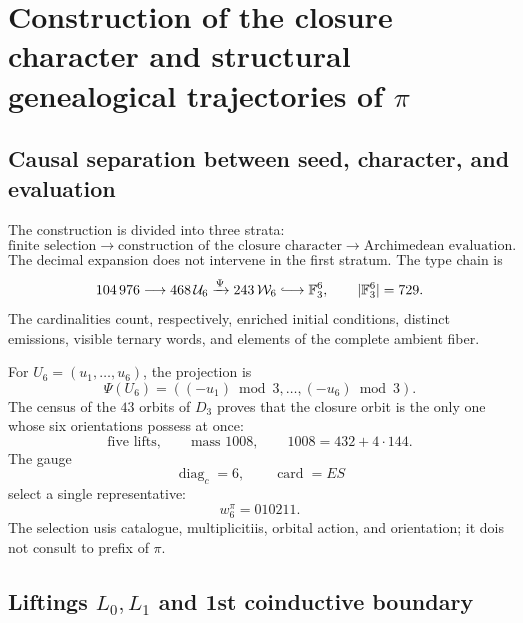 \label{chap:83-08}


\section{Construction of the closure character and structural genealogical trajectories of \(\pi\)}
\label{p12-83-c8-s1:chap:biografia-pi-autonoma}

\subsection{Causal separation between seed, character, and evaluation}

The construction is divided into three strata:
\[
 \text{finite selection}
 \longrightarrow
 \text{construction of the closure character}
 \longrightarrow
 \text{Archimedean evaluation}.
\]
The decimal expansion does not intervene in the first stratum. The type chain
is
\begin{equation}
 104\,976
 \longrightarrow468\,\mathcal U_6
 \xrightarrow{\Psi}243\,\mathcal W_6
 \lhook\joinrel\longrightarrow\mathbb F_3^6,
 \qquad|\mathbb F_3^6|=729.
 \label{p12-83-c8-s1:eq:cadena-tipica-pi-autonoma}
\end{equation}
The cardinalities count, respectively, enriched initial conditions,
distinct emissions, visible ternary words, and elements
of the complete ambient fiber.

For \(U_6=(u_1,\ldots,u_6)\), the projection is
\[
 \Psi(U_6)=((-u_1)\bmod3,\ldots,(-u_6)\bmod3).
\]
The census of the \(43\) orbits of \(D_3\) proves that the closure
orbit is the only one whose six orientations possess at once:
\[
 \text{five lifts},\qquad
 \text{mass }1008,\qquad
 1008=432+4\cdot144.
\]
The gauge
\[
 \operatorname{diag}_c=6,
 \qquad
 \operatorname{card}=ES
\]
select a single representative:
\begin{equation}
 \boxed{w_6^\pi=010211.}
 \label{p12-83-c8-s1:eq:semilla-pi-autonoma}
\end{equation}
The selection usis catalogue, multiplicitiis, orbital action, and orientation;
it dois not consult to prefix of \(\pi\).

\subsection{Liftings \(L_0,L_1\) and 1st coinductive boundary}

